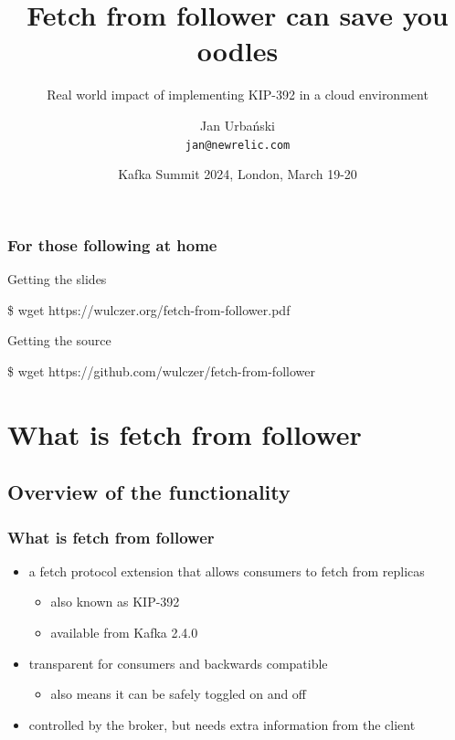 \documentclass{beamer}
\title{Fetch from follower can save you oodles}
\subtitle{Real world impact of implementing KIP-392 in a cloud environment}
\author[Jan Urbański]{Jan Urbański \\ \texttt{jan@newrelic.com}}
\institute{New Relic}
\date[Kafka Summit 2024]{Kafka Summit 2024, London, March 19-20}
\newlength{\wideitemsep}
\let\olditem\item
\renewcommand{\item}{\setlength{\itemsep}{\wideitemsep}\olditem}
\begin{document}
\frame{\titlepage}

\begin{frame}[fragile]
  \frametitle{For those following at home}

  \begin{block}{Getting the slides}
    \begin{semiverbatim}
    \$ wget https://wulczer.org/fetch-from-follower.pdf
    \end{semiverbatim}
  \end{block}

  \begin{block}{Getting the source}
    \begin{semiverbatim}
    \$ wget https://github.com/wulczer/fetch-from-follower
    \end{semiverbatim}
  \end{block}
\end{frame}

\begin{frame}
  \tableofcontents
\end{frame}

\section{What is fetch from follower}
\subsection{Overview of the functionality}

\begin{frame}
  \frametitle{What is fetch from follower}

  \begin{itemize}
  \item a fetch protocol extension that allows consumers to \alert{fetch from replicas}
    \begin{itemize}
    \item also known as \alert{KIP-392}
    \item available from \alert{Kafka 2.4.0}
    \end{itemize}
  \item \alert{transparent} for consumers and backwards compatible
    \begin{itemize}
      \item also means it can be safely toggled on and off
    \end{itemize}
  \item controlled by the \alert{broker}, but needs extra information from the \alert{client}
  \end{itemize}
\end{frame}
\end{document}
